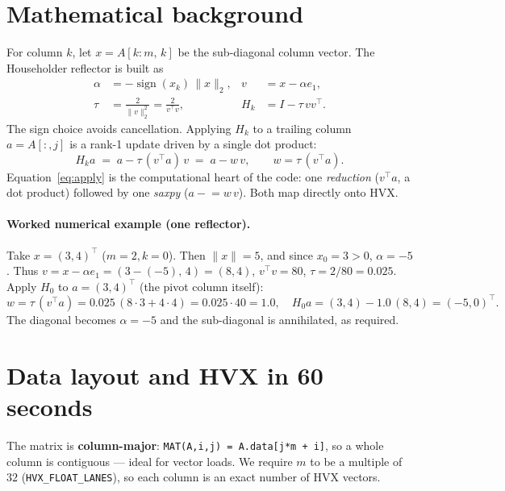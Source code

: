 \documentclass[11pt]{article}
\newcommand{\code}[1]{\texttt{\small #1}}
\begin{document}
\section{Mathematical background}
For column $k$, let $x=A[k{:}m,\,k]$ be the sub-diagonal column vector. The Householder
reflector is built as
\begin{align}
\alpha &= -\operatorname{sign}(x_k)\,\lVert x\rVert_2, &
v &= x - \alpha e_1,\\
\tau &= \frac{2}{\lVert v\rVert_2^{2}} = \frac{2}{v^{\!\top} v}, &
H_k &= I - \tau\, v v^{\!\top}.
\end{align}
The sign choice avoids cancellation. Applying $H_k$ to a trailing column $a=A[:,j]$ is a
rank-1 update driven by a single dot product:
\begin{equation}
\label{eq:apply}
H_k a \;=\; a - \tau\,(v^{\!\top} a)\,v \;=\; a - w\,v,\qquad w=\tau\,(v^{\!\top}a).
\end{equation}
Equation~\eqref{eq:apply} is the computational heart of the code: one \emph{reduction}
($v^{\!\top}a$, a dot product) followed by one \emph{saxpy} ($a\mathrel{-}=w\,v$). Both
map directly onto HVX.

\paragraph{Worked numerical example (one reflector).}
Take $x=(3,4)^{\!\top}$ ($m{=}2,k{=}0$). Then $\lVert x\rVert=5$, and since $x_0=3>0$,
$\alpha=-5$. Thus $v=x-\alpha e_1=(3{-}(-5),\,4)=(8,4)$, $v^{\!\top}v=80$, $\tau=2/80=0.025$.
Apply $H_0$ to $a=(3,4)^{\!\top}$ (the pivot column itself):
\[
w=\tau\,(v^{\!\top}a)=0.025\,(8\cdot3+4\cdot4)=0.025\cdot 40 = 1.0,\quad
H_0 a = (3,4)-1.0\,(8,4)=(-5,0)^{\!\top}.
\]
The diagonal becomes $\alpha=-5$ and the sub-diagonal is annihilated, as required.

\section{Data layout and HVX in 60 seconds}
The matrix is \textbf{column-major}: \code{MAT(A,i,j) = A.data[j*m + i]}, so a whole
column is contiguous --- ideal for vector loads. We require $m$ to be a multiple of
$32$ (\code{HVX\_FLOAT\_LANES}), so each column is an exact number of HVX vectors.
\end{document}

